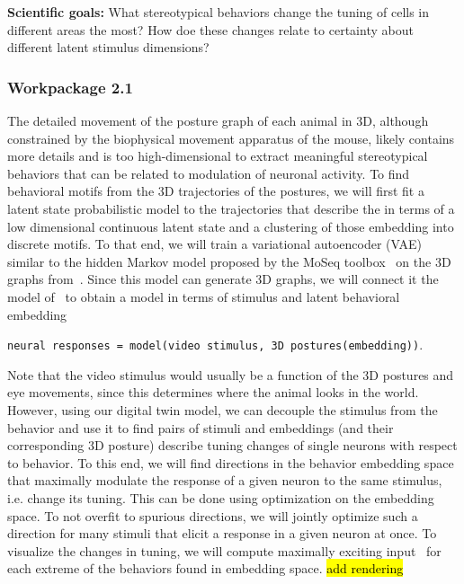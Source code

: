 \documentclass[B2,COG]{ercgrant}
\begin{document}
\textbf{Scientific goals:} What stereotypical behaviors change the tuning of cells in different areas the most? How doe these changes relate to certainty about different latent stimulus dimensions?



\subsubsection{Workpackage 2.1\hfill {}}
The detailed movement of the posture graph of each animal in 3D, although constrained by the biophysical movement apparatus of the mouse, likely contains more details and is too high-dimensional to extract meaningful stereotypical behaviors that can be related to modulation of neuronal activity. 
To find behavioral motifs from the 3D trajectories of the postures, we will first fit a latent state probabilistic model to the trajectories that describe the in terms of a low dimensional continuous latent state and a clustering of those embedding into discrete motifs.
To that end, we will train a variational autoencoder (VAE) similar to the hidden Markov model proposed by the MoSeq toolbox~\parencite{Wiltschko2015-ey, Wiltschko2020-zd} on the 3D graphs from~.
Since this model can generate 3D graphs, we will connect it the model of~ to obtain a model in terms of stimulus and latent behavioral embedding
\begin{center}
    \texttt{neural responses = model(video stimulus, 3D postures(embedding))}.
\end{center}
Note that the video stimulus would usually be a function of the 3D postures and eye movements, since this determines where the animal looks in the world. 
However, using our digital twin model, we can decouple the stimulus from the behavior and use it to find pairs of stimuli and embeddings (and their corresponding 3D posture) describe tuning changes of single neurons with respect to behavior. 
To this end, we will find directions in the behavior embedding space that maximally modulate the response of a given neuron to the same stimulus, i.e. change its tuning.
This can be done using optimization on the embedding space. 
To not overfit to spurious directions, we will jointly optimize such a direction for many stimuli that elicit a response in  a given neuron at once. 
To visualize the changes in tuning, we will compute maximally exciting input~\parencite[MEIs][]{Walker2019-yw} for each extreme of the behaviors found in embedding space. 
\hl{add rendering}
\end{document}
